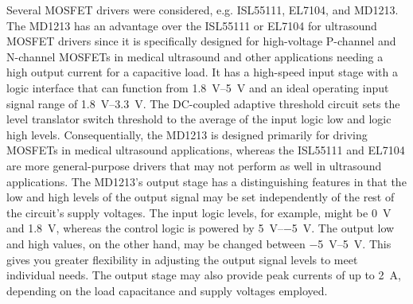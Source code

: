 Several MOSFET drivers were considered, e.g. ISL55111\cite{ISL55111}, EL7104\cite{EL7104}, and MD1213\cite{MD1213}. The MD1213 has an advantage over the ISL55111 or EL7104 for ultrasound MOSFET drivers since it is specifically designed for high-voltage P-channel and N-channel MOSFETs in medical ultrasound and other applications needing a high output current for a capacitive load. It has a high-speed input stage with a logic interface that can function from \qtyrange{1.8}{5}{\volt} and an ideal operating input signal range of \qtyrange{1.8}{3.3}{\volt}. The DC-coupled adaptive threshold circuit sets the level translator switch threshold to the average of the input logic \gls{low} and logic \gls{high} levels. Consequentially, the MD1213 is designed primarily for driving MOSFETs in medical ultrasound applications, whereas the ISL55111 and EL7104 are more general-purpose drivers that may not perform as well in ultrasound applications. The MD1213's output stage has a distinguishing features in that the \gls{low} and \gls{high} levels of the output signal may be set independently of the rest of the circuit's supply voltages. The input logic levels, for example, might be \qty{0}{\volt} and \qty{1.8}{\volt}, whereas the control logic is powered by \qtyrange[retain-explicit-plus]{+5}{-5}{\volt}. The output \gls{low} and \gls{high} values, on the other hand, may be changed between \qtyrange[retain-explicit-plus]{-5}{+5}{\volt}. This gives you greater flexibility in adjusting the output signal levels to meet individual needs. The output stage may also provide peak currents of up to \qty{2}{\ampere}, depending on the load capacitance and supply voltages employed.

